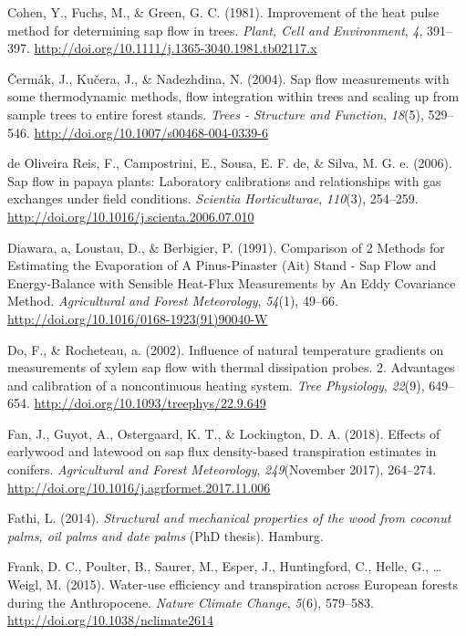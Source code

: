 \documentclass[11pt,twoside]{reedthesis}
\begin{document}
\hypertarget{ref-Cohen1981}{}
Cohen, Y., Fuchs, M., \& Green, G. C. (1981). Improvement of the heat
pulse method for determining sap flow in trees. \emph{Plant, Cell and
Environment}, \emph{4}, 391--397.
\url{http://doi.org/10.1111/j.1365-3040.1981.tb02117.x}

\hypertarget{ref-Cermak2004}{}
Čermák, J., Kučera, J., \& Nadezhdina, N. (2004). Sap flow measurements
with some thermodynamic methods, flow integration within trees and
scaling up from sample trees to entire forest stands. \emph{Trees -
Structure and Function}, \emph{18}(5), 529--546.
\url{http://doi.org/10.1007/s00468-004-0339-6}

\hypertarget{ref-DeOliveiraReis2006}{}
de Oliveira Reis, F., Campostrini, E., Sousa, E. F. de, \& Silva, M. G.
e. (2006). Sap flow in papaya plants: Laboratory calibrations and
relationships with gas exchanges under field conditions. \emph{Scientia
Horticulturae}, \emph{110}(3), 254--259.
\url{http://doi.org/10.1016/j.scienta.2006.07.010}

\hypertarget{ref-Diawara1991}{}
Diawara, a, Loustau, D., \& Berbigier, P. (1991). Comparison of 2
Methods for Estimating the Evaporation of A Pinus-Pinaster (Ait) Stand -
Sap Flow and Energy-Balance with Sensible Heat-Flux Measurements by An
Eddy Covariance Method. \emph{Agricultural and Forest Meteorology},
\emph{54}(1), 49--66. \url{http://doi.org/10.1016/0168-1923(91)90040-W}

\hypertarget{ref-Do2002}{}
Do, F., \& Rocheteau, a. (2002). Influence of natural temperature
gradients on measurements of xylem sap flow with thermal dissipation
probes. 2. Advantages and calibration of a noncontinuous heating system.
\emph{Tree Physiology}, \emph{22}(9), 649--654.
\url{http://doi.org/10.1093/treephys/22.9.649}

\hypertarget{ref-Fan2018}{}
Fan, J., Guyot, A., Ostergaard, K. T., \& Lockington, D. A. (2018).
Effects of earlywood and latewood on sap flux density-based
transpiration estimates in conifers. \emph{Agricultural and Forest
Meteorology}, \emph{249}(November 2017), 264--274.
\url{http://doi.org/10.1016/j.agrformet.2017.11.006}

\hypertarget{ref-Fathi2014}{}
Fathi, L. (2014). \emph{Structural and mechanical properties of the wood
from coconut palms, oil palms and date palms} (PhD thesis). Hamburg.

\hypertarget{ref-Frank2015}{}
Frank, D. C., Poulter, B., Saurer, M., Esper, J., Huntingford, C.,
Helle, G., \ldots{} Weigl, M. (2015). Water-use efficiency and
transpiration across European forests during the Anthropocene.
\emph{Nature Climate Change}, \emph{5}(6), 579--583.
\url{http://doi.org/10.1038/nclimate2614}
\end{document}
